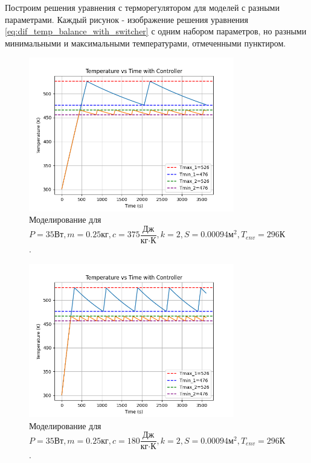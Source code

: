 Построим решения уравнения с терморегулятором для моделей с разными параметрами.
Каждый рисунок - изображение решения уравнения \ref{eq:dif_temp_balance_with_switcher} с одним набором параметров, но разными минимальными и максимальными температурами, отмеченными пунктиром.
\begin{figure}[h]  %
	\centering
	\includegraphics[width=0.8\textwidth]{imgs/heater_w._controll_3.png}  %
	\caption{Моделирование для 
		\[
		P=35\text{Вт}, m = 0.25\text{кг}, c=375\frac{\text{Дж}}{\text{кг}\cdot\text{К}},k = 2, S = 0.00094 \text{м}^2,T_{env}= 296 \text{К}
		\].}  %
	\label{fig:heater_with_controll_3}  
\end{figure}
\newpage
\begin{figure}[h]  %
	\centering
	\includegraphics[width=0.8\textwidth]{imgs/heater_w._controll_2.png}  %
	\caption{Моделирование для 
		\[
		P=35\text{Вт}, m = 0.25\text{кг}, c=180\frac{\text{Дж}}{\text{кг}\cdot\text{К}},k = 2, S = 0.00094 \text{м}^2,T_{env}= 296 \text{К}
		\].}  %
	\label{fig:heater_with_controll_2}  
\end{figure}
